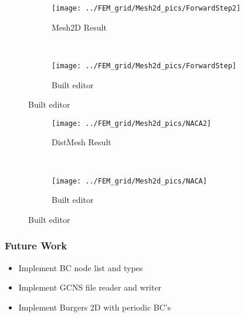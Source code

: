 \begin{frame}
	\begin{figure}
        \centering
        \begin{subfigure}[b]{0.45\textwidth}
                \centering
                \texttt{[image: ../FEM\_grid/Mesh2d\_pics/ForwardStep2]}
                \caption{Mesh2D Result}
                \label{fig:forwardstep1}
        \end{subfigure}%
				~ %
        \begin{subfigure}[b]{0.45\textwidth}
                \centering
                \texttt{[image: ../FEM\_grid/Mesh2d\_pics/ForwardStep]}
                \caption{Built editor}
                \label{fig:forwardstep2}
				\end{subfigure}
				\label{fig:NACA}
	\end{figure}
\end{frame}

\begin{frame}
	\begin{figure}
        \centering
        \begin{subfigure}[b]{0.45\textwidth}
                \centering
                \texttt{[image: ../FEM\_grid/Mesh2d\_pics/NACA2]}
                \caption{DistMesh Result}
                \label{fig:naca1}
        \end{subfigure}%
				~ %
        \begin{subfigure}[b]{0.45\textwidth}
                \centering
                \texttt{[image: ../FEM\_grid/Mesh2d\_pics/NACA]}
                \caption{Built editor}
                \label{fig:naca2}
				\end{subfigure}
				\label{fig:NACA}
	\end{figure}
\end{frame}

\begin{frame} \frametitle{Future Work}
	\begin{itemize}
		\item Implement BC node list and types
		\item Implement GCNS file reader and writer
		\item Implement Burgers 2D with periodic BC's
	\end{itemize}
\end{frame}